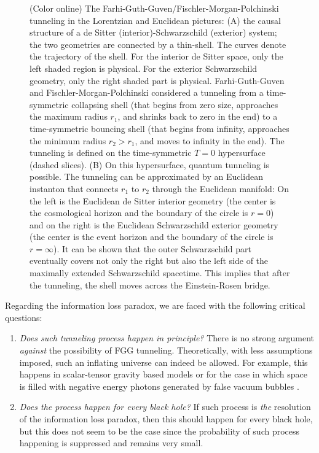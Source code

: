 \documentclass[12pt]{article}
\newcommand{\2}{$^2$}
\newcommand{\3}{$^3$}
\newcommand{\4}{$_4$}
\newcommand{\5}{$_5$}
\begin{document}
\begin{figure}
\begin{center}
\caption{\label{fig:FGG}(Color online) The Farhi-Guth-Guven/Fischler-Morgan-Polchinski tunneling in the Lorentzian and Euclidean pictures:  (A) the causal structure of a de Sitter (interior)-Schwarzschild (exterior) system; the two geometries are connected by a thin-shell. The curves denote the trajectory of the shell. For the interior de Sitter space, only the left shaded region is physical. For the exterior Schwarzschild geometry, only the right shaded part is physical. Farhi-Guth-Guven and Fischler-Morgan-Polchinski considered a tunneling from a time-symmetric collapsing shell (that begins from zero size, approaches the maximum radius $r_{1}$, and shrinks back to zero in the end) to a time-symmetric bouncing shell (that begins from infinity, approaches the minimum radius $r_{2} > r_{1}$, and moves to infinity in the end). The tunneling is defined on the time-symmetric $T = 0$ hypersurface (dashed slices). (B) On this hypersurface, quantum tunneling is possible. The tunneling can be approximated by an Euclidean instanton that connects $r_{1}$ to $r_{2}$ through the Euclidean manifold: On the left is the Euclidean de Sitter interior geometry (the center is the cosmological horizon and the boundary of the circle is $r = 0$) and on the right is the Euclidean Schwarzschild exterior geometry (the center is the event horizon and the boundary of the circle is $r =\infty$). It can be shown that the outer Schwarzschild part eventually covers not only the right but also the left side of the maximally extended Schwarzschild spacetime. This implies that after the tunneling, the shell moves across the Einstein-Rosen bridge.
}
\end{center}
\end{figure}

Regarding the information loss paradox, we are faced with the following critical questions:
\begin{enumerate}
\item \textit{Does such tunneling process happen in principle?} There is no strong argument \emph{against} the possibility of FGG tunneling. Theoretically, with less assumptions imposed, such an inflating universe can indeed be allowed. For example, this happens in scalar-tensor gravity based models \cite{Kim:2010yr,Lee:2010yd} or for the case in which space is filled with negative energy photons  generated by false vacuum bubbles \cite{Yeom:2009mn1, Yeom:2009mn2, Yeom:2009mn3}. 
\item \textit{Does the process happen for every black hole?} If such process is \emph{the}  resolution of the information loss paradox, then this should happen for every black hole, but this does not seem to be the case since the probability of such process happening is suppressed and remains very small. 
\end{enumerate}
\end{document}
